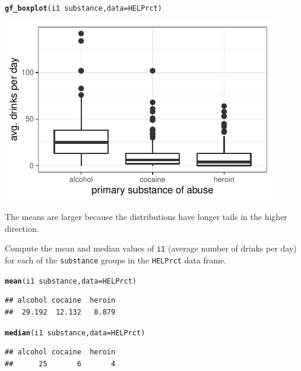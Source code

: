 \documentclass[twoside]{book}\usepackage[]{graphicx}\usepackage[]{xcolor}
\makeatletter
\def\maxwidth{ %
  \ifdim\Gin@nat@width>\linewidth
    \linewidth
  \else
    \Gin@nat@width
  \fi
}
\newcommand{\hlopt}[1]{\textcolor[rgb]{0,0,0}{#1}}%
\newcommand{\hlstd}[1]{\textcolor[rgb]{0.345,0.345,0.345}{#1}}%
\newcommand{\hlkwc}[1]{\textcolor[rgb]{0.333,0.667,0.333}{#1}}%
\newcommand{\hlkwd}[1]{\textcolor[rgb]{0.737,0.353,0.396}{\textbf{#1}}}%
\newenvironment{kframe}{%
 \def\at@end@of@kframe{}%
 \ifinner\ifhmode%
  \def\at@end@of@kframe{\end{minipage}}%
  \begin{minipage}{\columnwidth}%
 \fi\fi%
 \def\FrameCommand##1{\hskip\@totalleftmargin \hskip-\fboxsep
 \colorbox{shadecolor}{##1}\hskip-\fboxsep
     \hskip-\linewidth \hskip-\@totalleftmargin \hskip\columnwidth}%
 \MakeFramed {\advance\hsize-\width
   \@totalleftmargin\z@ \linewidth\hsize
   \@setminipage}}%
 {\par\unskip\endMakeFramed%
 \at@end@of@kframe}
\newenvironment{knitrout}{}{} %
\newcommand{\variable}[1]{{\color{green!50!black}\texttt{#1}}}
\newcommand{\Rindex}[1]{\index{\texttt{#1}}}
\newcommand{\dataframe}[1]{{\color{blue!80!black}\texttt{#1}}\Rindex{#1}}
\makeatother
\begin{document}
\begin{solution}
\begin{knitrout}
\color{fgcolor}\begin{kframe}
\begin{alltt}
\hlkwd{gf_boxplot}\hlstd{(i1} \hlopt{~} \hlstd{substance ,} \hlkwc{data} \hlstd{= HELPrct)}
\end{alltt}
\end{kframe}

{\centering \includegraphics[width=\maxwidth]{figures/fig-unnamed-chunk-36-1} 

}



\end{knitrout}
	The means are larger because the distributions have longer tails in the 
	higher direction.  
\end{solution}

\begin{problem}
	Compute the mean and median values of \variable{i1} (average number of
	drinks per day) for each of the \variable{substance} groups in the 
	\dataframe{HELPrct} data frame.
\end{problem}

\begin{solution}
\begin{knitrout}
\color{fgcolor}\begin{kframe}
\begin{alltt}
\hlkwd{mean}\hlstd{(i1} \hlopt{~} \hlstd{substance,} \hlkwc{data} \hlstd{= HELPrct)}
\end{alltt}
\begin{verbatim}
## alcohol cocaine  heroin 
##  29.192  12.132   8.879
\end{verbatim}
\begin{alltt}
\hlkwd{median}\hlstd{(i1} \hlopt{~} \hlstd{substance,} \hlkwc{data} \hlstd{= HELPrct)}
\end{alltt}
\begin{verbatim}
## alcohol cocaine  heroin 
##      25       6       4
\end{verbatim}
\end{kframe}
\end{knitrout}
\end{solution}
\end{document}
